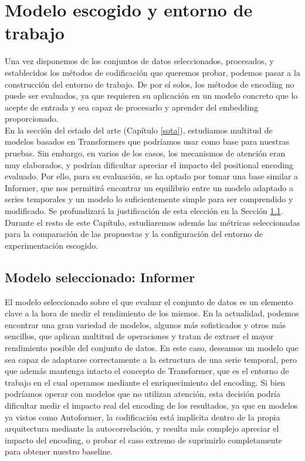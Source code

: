 \chapter{Modelo escogido y entorno de trabajo}
\label{cap5}

Una vez disponemos de los conjuntos de datos seleccionados, procesados, y establecidos los métodos de codificación que queremos probar, podemos pasar a la construcción del entorno de trabajo. De por sí solos, los métodos de encoding no puede ser evaluados, ya que requieren su aplicación en un modelo concreto que lo acepte de entrada y sea capaz de procesarlo y aprender del embedding proporcionado.\\

En la sección del estado del arte (Capítulo \ref{sota}), estudiamos multitud de modelos basados en Transformers que podríamos usar como base para nuestras pruebas. Sin embargo, en varios de los casos, los mecanismos de atención eran muy elaborados, y podrían dificultar apreciar el impacto del positional encoding evaluado. Por ello, para su evaluación, se ha optado por tomar una base similar a Informer, que nos permitirá encontrar un equilibrio entre un modelo adaptado a series temporales y un modelo lo suficientemente simple para ser comprendido y modificado. Se profundizará la justificación de esta elección en la Sección \ref{modelo}.\\

Durante el resto de este Capítulo, estudiaremos además las métricas seleccionadas para la comparación de las propuestas y la configuración del entorno de experimentación escogido.

\section{Modelo seleccionado: Informer}
\label{modelo}

El modelo seleccionado sobre el que evaluar el conjunto de datos es un elemento clave a la hora de medir el rendimiento de los mismos. En la actualidad, podemos encontrar una gran variedad de modelos, algunos más sofisticados y otros más sencillos, que aplican multitud de operaciones y tratan de extraer el mayor rendimiento posible del conjunto de datos. En este caso, deseamos un modelo que sea capaz de adaptarse correctamente a la estructura de una serie temporal, pero que además mantenga intacto el concepto de Transformer, que es el entorno de trabajo en el cual operamos mediante el enriquecimiento del encoding. Si bien podríamos operar con modelos que no utilizan atención, esta decisión podría dificultar medir el impacto real del encoding de los resultados, ya que en modelos ya vistos como Autoformer, la codificación está implícita dentro de la propia arquitectura mediante la autocorrelación, y resulta más complejo apreciar el impacto del encoding, o probar el caso extremo de suprimirlo completamente para obtener nuestro baseline.\\

